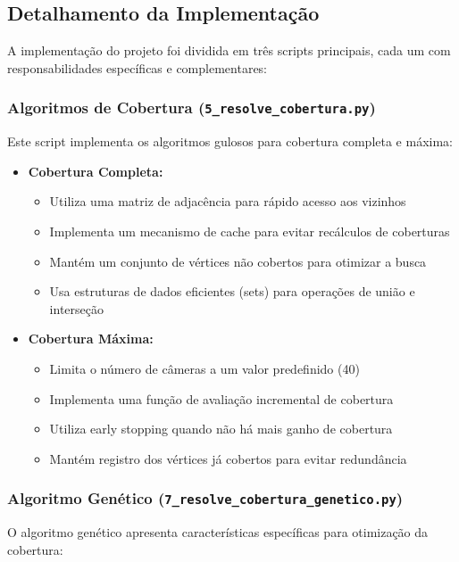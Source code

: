 \documentclass[12pt, a4paper]{report}
\begin{document}
\subsection{Detalhamento da Implementação}
A implementação do projeto foi dividida em três scripts principais, cada um com responsabilidades específicas e complementares:

\subsubsection{Algoritmos de Cobertura (\texttt{5\_resolve\_cobertura.py})}
Este script implementa os algoritmos gulosos para cobertura completa e máxima:

\begin{itemize}
    \item \textbf{Cobertura Completa:}
    \begin{itemize}
        \item Utiliza uma matriz de adjacência para rápido acesso aos vizinhos
        \item Implementa um mecanismo de cache para evitar recálculos de coberturas
        \item Mantém um conjunto de vértices não cobertos para otimizar a busca
        \item Usa estruturas de dados eficientes (sets) para operações de união e interseção
    \end{itemize}
    
    \item \textbf{Cobertura Máxima:}
    \begin{itemize}
        \item Limita o número de câmeras a um valor predefinido (40)
        \item Implementa uma função de avaliação incremental de cobertura
        \item Utiliza early stopping quando não há mais ganho de cobertura
        \item Mantém registro dos vértices já cobertos para evitar redundância
    \end{itemize}
\end{itemize}

\subsubsection{Algoritmo Genético (\texttt{7\_resolve\_cobertura\_genetico.py})}
O algoritmo genético apresenta características específicas para otimização da cobertura:
\end{document}
